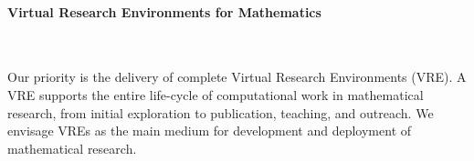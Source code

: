 
\paragraph{Virtual Research Environments for Mathematics}\ 




\begin{center}
  \begin{boxedminipage}{.95\textwidth}\em

    Our priority is the delivery of complete Virtual Research
    Environments (VRE). A VRE supports the entire life-cycle of
    computational work in mathematical research, from initial
    exploration to publication, teaching, and outreach. We envisage
    VREs as the main medium for development and deployment of
    mathematical research.
  \end{boxedminipage}
\end{center}

